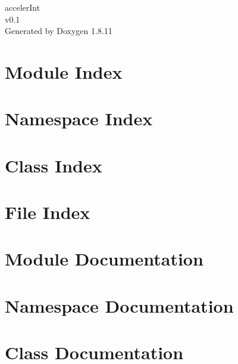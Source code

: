 \documentclass[twoside]{book}
\newcommand{\+}{\discretionary{\mbox{\scriptsize$\hookleftarrow$}}{}{}}
\newcommand{\clearemptydoublepage}{%
  \newpage{\pagestyle{empty}\cleardoublepage}%
}
\begin{document}
\hypersetup{pageanchor=false,
             bookmarksnumbered=true,
             pdfencoding=unicode
            }
\begin{titlepage}
\vspace*{7cm}
\begin{center}%
{\Large acceler\+Int \\[1ex]\large v0.\+1 }\\
\vspace*{1cm}
{\large Generated by Doxygen 1.8.11}\\
\end{center}
\end{titlepage}
\clearemptydoublepage
\tableofcontents
\clearemptydoublepage
{}
\hypersetup{pageanchor=true}

\chapter{Module Index}

\chapter{Namespace Index}

\chapter{Class Index}

\chapter{File Index}

\chapter{Module Documentation}




\chapter{Namespace Documentation}






\chapter{Class Documentation}




\end{document}
